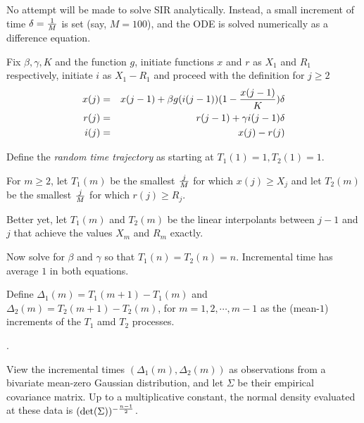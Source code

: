 \documentclass{article}
\begin{document}
\noindent No attempt will be made to solve SIR analytically. Instead, a small increment of time $\delta={1 \over M}$ is set (say, $M=100$), and the ODE is solved numerically as a difference equation.

\newpage

\noindent Fix $\beta, \gamma, K$ and the function $g$, initiate functions $x$ and $r$ as $X_1$ and $R_1$ respectively, initiate $i$ as $X_1-R_1$ and proceed with the definition for $j \ge 2$
\begin{eqnarray}
x(j)&=&x(j-1)+\beta g(i(j-1))(1-{{x(j-1)} \over K}) \delta \nonumber \\
r(j)&=&r(j-1)+\gamma i(j-1) \delta \nonumber \\
i(j)&=&x(j)-r(j) \label{thesolution}
\end{eqnarray}

\bigskip

\noindent Define the {\em random time trajectory} as starting at $T_1(1)=1, T_2(1)=1$.

\bigskip

\noindent For $m \ge 2$, let $T_1(m)$ be the smallest ${j \over M}$ for which $x(j) \ge X_j$ and let $T_2(m)$ be the smallest ${j \over M}$ for which $r(j) \ge R_j$.

\bigskip

\noindent Better yet, let $T_1(m)$ and $T_2(m)$ be the linear interpolants between $j-1$ and $j$ that achieve the values $X_m$ and $R_m$ exactly.

\bigskip

\noindent Now solve for $\beta$ and $\gamma$ so that $T_1(n)=T_2(n)=n$. Incremental time has average $1$ in both equations.

\bigskip

\noindent Define $\Delta_1(m)=T_1(m+1)-T_1(m)$ and $\Delta_2(m)=T_2(m+1)-T_2(m)$, for $m=1, 2, \cdots,m-1$ as the (mean-$1$) increments of the $T_1$ amd $T_2$ processes.

\newpage

.

\bigskip

\noindent View the incremental times $(\Delta_1(m),\Delta_2(m))$ as observations from a bivariate mean-zero Gaussian distribution, and let $\Sigma$ be their empirical covariance matrix. Up to a multiplicative constant, the normal density evaluated at these data is $(\det(\Sigma))^{-{{n-1} \over 2}}$.

\bigskip
\end{document}
